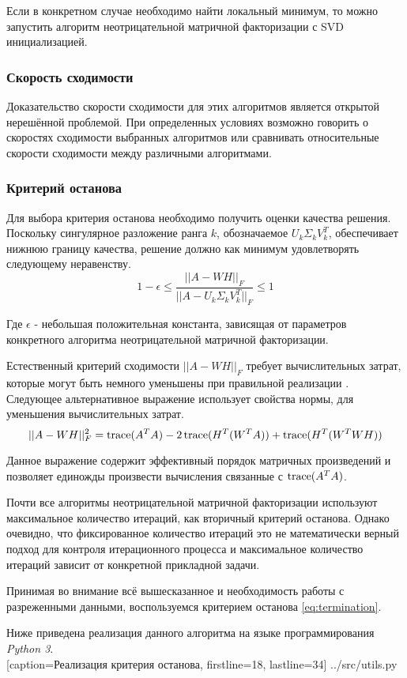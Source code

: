Если в конкретном случае необходимо найти  локальный минимум,
то можно запустить алгоритм неотрицательной матричной факторизации с SVD инициализацией.

\subsubsection{Скорость сходимости}

Доказательство скорости сходимости для этих алгоритмов является открытой нерешённой проблемой.
При определенных условиях возможно говорить о скоростях сходимости выбранных алгоритмов
или сравнивать относительные скорости сходимости между различными алгоритмами.

\subsubsection{Критерий останова}

Для выбора критерия останова необходимо получить оценки качества решения.
Поскольку сингулярное разложение ранга $k$, обозначаемое $U_k \Sigma_k V_k^T$,
обеспечивает нижнюю границу качества, решение должно как минимум удовлетворять следующему неравенству.
\begin{equation*}
  1 - \epsilon \leq \frac{||A - WH||_F}{||A - U_k \Sigma_k V_k^T||_F} \leq 1
\end{equation*}

Где $\epsilon$ - небольшая положительная константа, зависящая от параметров
конкретного алгоритма неотрицательной матричной факторизации.

Естественный критерий сходимости $||A - WH||_F$ требует вычислительных затрат,
которые могут быть немного уменьшены при правильной реализации \cite{berry}.
Следующее альтернативное выражение использует свойства нормы, для уменьшения вычислительных затрат.
\begin{equation} \label{eq:termination}
  ||A - WH||^2_F = \operatorname{trace} (A^T A) - 2 \operatorname{trace}(H^T (W^T A)) + \operatorname{trace}(H^T (W^T W H))
\end{equation}

Данное выражение содержит эффективный порядок матричных произведений и позволяет
единожды произвести вычисления связанные с $\operatorname{trace}(A^T A)$.

Почти все алгоритмы неотрицательной матричной факторизации используют
максимальное количество итераций, как вторичный критерий останова.
Однако очевидно, что фиксированное количество итераций это не математически верный
подход для контроля итерационного процесса и максимальное количество итераций зависит от конкретной прикладной задачи.

Принимая во внимание всё вышесказанное и необходимость работы с разреженными данными,
воспользуемся критерием останова \eqref{eq:termination}.

\newpage

Ниже приведена реализация данного алгоритма на языке программирования \textit{Python 3}.
\\


  [caption=Реализация критерия останова, firstline=18, lastline=34]
  {../src/utils.py}
